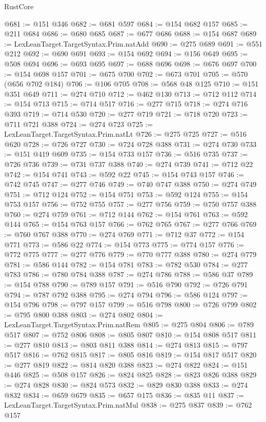 \begin{lexlean}{RustCore}
\begin{coremodule}
@681 := @151 @346
@682 := @681 @597
@684 := @154 @682 @157
@685 := @211 @684
@686 := @680 @685
@687 := @677 @686
@688 := @154 @687
@689 := LexLeanTarget.TargetSyntax.Prim.natAdd
@690 := @275 @689
@691 := @551 @212
@692 := @690 @691
@693 := @154 @692
@694 := @156 @649
@695 := @508 @694
@696 := @693 @695
@697 := @688 @696
@698 := @676 @697
@700 := @154 @698 @157
@701 := @675 @700
@702 := @673 @701
@705 := @570 (@656 @702 @184)
@706 := @106 @705
@708 := @568 @48 @125
@710 := @151 @351 @649
@711 := @274 @710
@712 := @462 @130
@713 := @712 @112
@714 := @154 @713
@715 := @714 @517
@716 := @277 @715
@718 := @274 @716 @393
@719 := @714 @530
@720 := @277 @719
@721 := @718 @720
@723 := @711 @721 @388
@724 := @274 @723
@725 := LexLeanTarget.TargetSyntax.Prim.natLt
@726 := @275 @725
@727 := @516 @620
@728 := @726 @727
@730 := @724 @728 @388
@731 := @274 @730
@733 := @151 @419 @609
@735 := @154 @733 @157
@736 := @516 @735
@737 := @726 @736
@739 := @731 @737 @388
@740 := @274 @739
@741 := @712 @22
@742 := @154 @741
@743 := @592 @22
@745 := @154 @743 @157
@746 := @742 @745
@747 := @277 @746
@749 := @740 @747 @388
@750 := @274 @749
@751 := @712 @124
@752 := @154 @751
@753 := @592 @124
@755 := @154 @753 @157
@756 := @752 @755
@757 := @277 @756
@759 := @750 @757 @388
@760 := @274 @759
@761 := @712 @144
@762 := @154 @761
@763 := @592 @144
@765 := @154 @763 @157
@766 := @762 @765
@767 := @277 @766
@769 := @760 @767 @388
@770 := @274 @769
@771 := @712 @37
@772 := @154 @771
@773 := @586 @22
@774 := @154 @773
@775 := @774 @157
@776 := @772 @775
@777 := @277 @776
@779 := @770 @777 @388
@780 := @274 @779
@781 := @586 @144
@782 := @154 @781
@783 := @782 @530
@784 := @277 @783
@786 := @780 @784 @388
@787 := @274 @786
@788 := @586 @37
@789 := @154 @788
@790 := @789 @157
@791 := @516 @790
@792 := @726 @791
@794 := @787 @792 @388
@795 := @274 @794
@796 := @586 @124
@797 := @154 @796
@798 := @797 @157
@799 := @516 @798
@800 := @726 @799
@802 := @795 @800 @388
@803 := @274 @802
@804 := LexLeanTarget.TargetSyntax.Prim.natRem
@805 := @275 @804
@806 := @789 @517
@807 := @752 @806
@808 := @805 @807
@810 := @154 @808 @517
@811 := @277 @810
@813 := @803 @811 @388
@814 := @274 @813
@815 := @797 @517
@816 := @762 @815
@817 := @805 @816
@819 := @154 @817 @517
@820 := @277 @819
@822 := @814 @820 @388
@823 := @274 @822
@824 := @151 @446
@825 := @508 @157
@826 := @824 @825
@828 := @823 @826 @388
@829 := @274 @828
@830 := @824 @573
@832 := @829 @830 @388
@833 := @274 @832
@834 := @659 @679
@835 := @657 @175
@836 := @835 @11
@837 := LexLeanTarget.TargetSyntax.Prim.natMul
@838 := @275 @837
@839 := @762 @157

\end{coremodule}
\end{lexlean}
